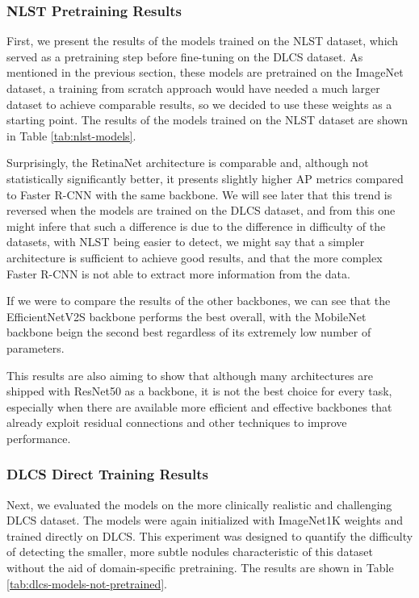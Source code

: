 \subsubsection{NLST Pretraining Results}
First, we present the results of the models trained on the NLST dataset, which served as a pretraining step before fine-tuning on the DLCS dataset.
As mentioned in the previous section, these models are pretrained on the ImageNet dataset, a training from scratch approach would have needed a much larger dataset to achieve comparable results, so we decided to use these weights as a starting point.
The results of the models trained on the NLST dataset are shown in Table \ref{tab:nlst-models}.



Surprisingly, the RetinaNet architecture is comparable and, although not statistically significantly better, it presents slightly higher AP metrics compared to Faster R-CNN with the same backbone.
We will see later that this trend is reversed when the models are trained on the DLCS dataset, and from this one might infere that such a difference is due to the difference in difficulty of the datasets, with NLST being easier to detect, we might say that a simpler architecture is sufficient to achieve good results, and that the more complex Faster R-CNN is not able to extract more information from the data.

If we were to compare the results of the other backbones, we can see that the EfficientNetV2S backbone performs the best overall, with the MobileNet backbone beign the second best regardless of its extremely low number of parameters.

This results are also aiming to show that although many architectures are shipped with ResNet50 as a backbone, it is not the best choice for every task, especially when there are available more efficient and effective backbones that already exploit residual connections and other techniques to improve performance.

\subsubsection{DLCS Direct Training Results}
Next, we evaluated the models on the more clinically realistic and challenging DLCS dataset. The models were again initialized with ImageNet1K weights and trained directly on DLCS. This experiment was designed to quantify the difficulty of detecting the smaller, more subtle nodules characteristic of this dataset without the aid of domain-specific pretraining. The results are shown in Table \ref{tab:dlcs-models-not-pretrained}.

